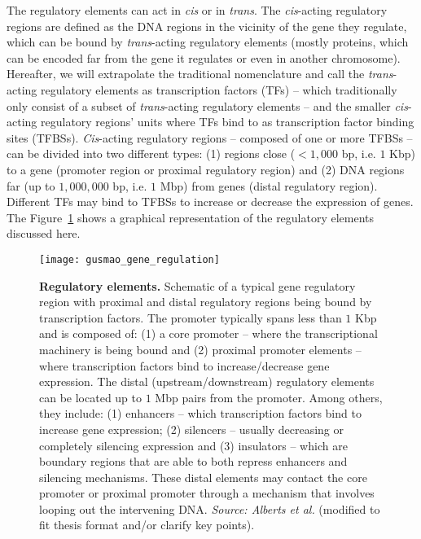 The regulatory elements can act in \emph{cis} or in \emph{trans}. The \emph{cis}-acting regulatory regions are defined as the DNA regions in the vicinity of the gene they regulate, which can be bound by \emph{trans}-acting regulatory elements (mostly proteins, which can be encoded far from the gene it regulates or even in another chromosome). Hereafter, we will extrapolate the traditional nomenclature and call the \emph{trans}-acting regulatory elements as transcription factors (TFs) -- which traditionally only consist of a subset of \emph{trans}-acting regulatory elements -- and the smaller \emph{cis}-acting regulatory regions' units where TFs bind to as transcription factor binding sites (TFBSs). \emph{Cis}-acting regulatory regions -- composed of one or more TFBSs -- can be divided into two different types: (1) regions close ($< $\approxy$1,000$ bp, i.e. $1$ Kbp) to a gene (promoter region or proximal regulatory region) and (2) DNA regions far (up to \approxy$1,000,000$ bp, i.e. $1$ Mbp) from genes (distal regulatory region). Different TFs may bind to TFBSs to increase or decrease the expression of genes. The Figure~\ref{fig:alberts_gene_regulation} shows a graphical representation of the regulatory elements discussed here.

\begin{figure}[h!]
\centering
\texttt{[image: gusmao\_gene\_regulation]}
\caption[Regulatory elements]{\textbf{Regulatory elements.} Schematic of a typical gene regulatory region with proximal and distal regulatory regions being bound by transcription factors. The promoter typically spans less than $1$ Kbp and is composed of: (1) a core promoter -- where the transcriptional machinery is being bound and (2) proximal promoter elements -- where transcription factors bind to increase/decrease gene expression. The distal (upstream/downstream) regulatory elements can be located up to $1$ Mbp pairs from the promoter. Among others, they include: (1) enhancers -- which transcription factors bind to increase gene expression; (2) silencers -- usually decreasing or completely silencing expression and (3) insulators -- which are boundary regions that are able to both repress enhancers and silencing mechanisms. These distal elements may contact the core promoter or proximal promoter through a mechanism that involves looping out the intervening DNA. \emph{Source: Alberts et al.}\cite{alberts2007} (modified to fit thesis format and/or clarify key points).}
\label{fig:alberts_gene_regulation}
\end{figure}

